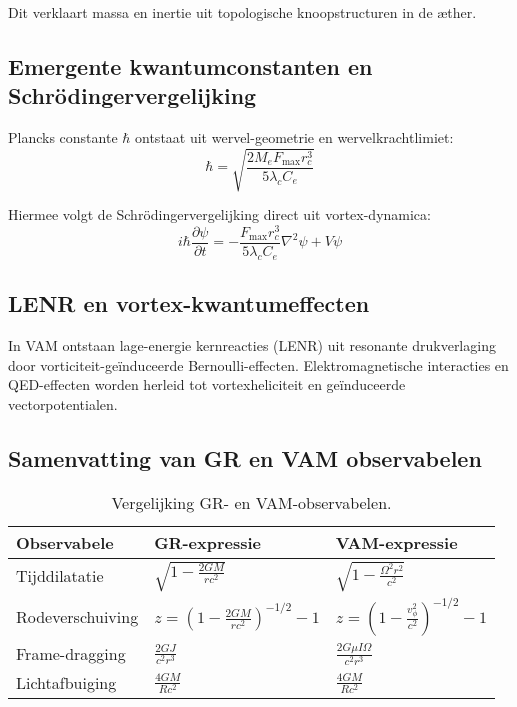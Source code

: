 Dit verklaart massa en inertie uit topologische knoopstructuren in de æther.

\subsection*{Emergente kwantumconstanten en Schrödingervergelijking}

Plancks constante $\hbar$ ontstaat uit wervel-geometrie en wervelkrachtlimiet:
\begin{equation}
    \hbar = \sqrt{\frac{2M_e F_{\max} r_c^3}{5 \lambda_c C_e}}
\end{equation}

Hiermee volgt de Schrödingervergelijking direct uit vortex-dynamica:
\begin{equation}
    i \hbar \frac{\partial \psi}{\partial t} = -\frac{F_{\max} r_c^3}{5 \lambda_c C_e}\nabla^2 \psi + V\psi
\end{equation}


\subsection*{LENR en vortex-kwantumeffecten}

In VAM ontstaan lage-energie kernreacties (LENR) uit resonante drukverlaging door vorticiteit-geïnduceerde Bernoulli-effecten. Elektromagnetische interacties en QED-effecten worden herleid tot vortexheliciteit en geïnduceerde vectorpotentialen.

\subsection*{Samenvatting van GR en VAM observabelen}

\begin{table}[h!]
    \centering
    \begin{tabular}{lll}
        \toprule
        \textbf{Observabele} & \textbf{GR-expressie} & \textbf{VAM-expressie} \\
        \midrule
        Tijddilatatie & $\sqrt{1-\frac{2GM}{rc^2}}$ & $\sqrt{1-\frac{\Omega^2 r^2}{c^2}}$\\[0.5em]
        Rodeverschuiving & $z=\left(1-\frac{2GM}{rc^2}\right)^{-1/2}-1$ & $z=\left(1-\frac{v_\phi^2}{c^2}\right)^{-1/2}-1$\\[0.5em]
        Frame-dragging & $\frac{2GJ}{c^2 r^3}$ & $\frac{2G\mu I\Omega}{c^2 r^3}$\\[0.5em]
        Lichtafbuiging & $\frac{4GM}{Rc^2}$ & $\frac{4GM}{Rc^2}$\\
        \bottomrule
    \end{tabular}
    \caption{Vergelijking GR- en VAM-observabelen.}
    \label{tab:vergelijkingen}
\end{table}




